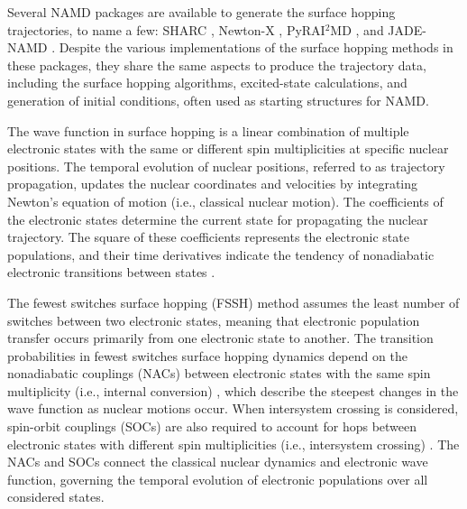 \documentclass[9pt,bestpractices]{livecoms}
\begin{document}
Several NAMD packages are available to generate the surface hopping trajectories, to name a few: SHARC \cite{RN139}, Newton-X \cite{RN157, RN2}, PyRAI$^2$MD \cite{RN140}, and JADE-NAMD \cite{RN84}. Despite the various implementations of the surface hopping methods in these packages, they share the same aspects to produce the trajectory data, including the surface hopping algorithms, excited-state calculations, and generation of initial conditions, often used as starting structures for NAMD.

The wave function in surface hopping is a linear combination of multiple electronic states with the same or different spin multiplicities at specific nuclear positions. The temporal evolution of nuclear positions, referred to as trajectory propagation, updates the nuclear coordinates and velocities by integrating Newton's equation of motion (i.e., classical nuclear motion). The coefficients of the electronic states determine the current state for propagating the nuclear trajectory. The square of these coefficients represents the electronic state populations, and their time derivatives indicate the tendency of nonadiabatic electronic transitions between states \cite{RN118}.

The fewest switches surface hopping (FSSH) method assumes the least number of switches between two electronic states, meaning that electronic population transfer occurs primarily from one electronic state to another. The transition probabilities in fewest switches surface hopping dynamics depend on the nonadiabatic couplings (NACs) between electronic states with the same spin multiplicity (i.e., internal conversion) \cite{RN83}, which describe the steepest changes in the wave function as nuclear motions occur. When intersystem crossing is considered, spin-orbit couplings (SOCs) are also required to account for hops between electronic states with different spin multiplicities (i.e., intersystem crossing) \cite{RN82, RN81}. The NACs and SOCs connect the classical nuclear dynamics and electronic wave function, governing the temporal evolution of electronic populations over all considered states.
\end{document}
